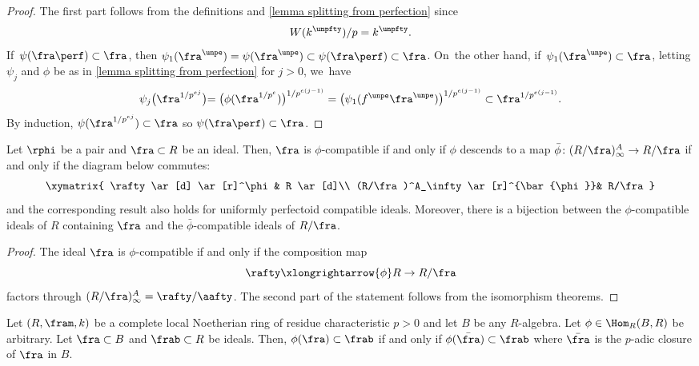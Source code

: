 \begin{proof}
The first part follows from the definitions and \autoref{lemma splitting from perfection} since
\[
W(k^\unpfty)/p=k^\unpfty.
\]
If~$\psi(\fra\perf)\subset\fra$, then $\psi_1(\fra^\unpe)=\psi(\fra^\unpe)\subset\psi(\fra\perf) \subset \fra$. On~the other hand, if~$\psi_1(\fra^\unpe)\subset \fra$,
letting $\psi_j$ and $\phi$ be as in \autoref{lemma splitting from perfection} for $j>0$, we~have
\[
\psi_j\bigl(\fra^{1/p^{ej}}\bigl)=\bigl(\phi(\fra^{1/p^{e}})\bigr)^{1/p^{e(j-1)}}=\bigl(\psi_1(f^\unpe\fra^\unpe) \bigr)^{1/p^{e(j-1)}}\subset \fra^{1/p^{e(j-1)}}.
\]
By induction, $\psi(\fra^{1/p^{ej}})\subset \fra$ so $\psi(\fra\perf)\subset \fra$.
\end{proof}

\begin{proposition}\label{compatible equivalent to comm diag quotient}
Let $\rphi$ be a pair and $\fra\subset R$ be an ideal. Then, $\fra$ is $\phi$\nobreakdash-compatible if and only if $\phi$ descends to a map $\bar{\phi}\colon(R/\fra)^A_\infty\to R/\fra$ \ie if and only if the diagram below commutes:\vspace*{-5pt}
\begin{equation}\label{comm diag quotient comp ideal}
\begin{array}{c}
\xymatrix{
\rafty \ar[d] \ar[r]^\phi & R \ar[d]\\
(R/\fra)^A_\infty\ar[r]^{\bar{\phi}}& R/\fra
}
\end{array}
\end{equation}
and the corresponding result also holds for uniformly perfectoid compatible ideals.
Moreover, there is a bijection between the $\phi$-compatible ideals of $R$ containing $\fra$ and the $\bar{\phi}$-compatible ideals of $R/\fra$.
\end{proposition}

\begin{proof}
The ideal $\fra$ is $\phi$-compatible if and only if the composition map
\[\rafty\xlongrightarrow{\phi} R\to R/\fra
\]factors through $(R/\fra)_\infty^A=\rafty/\aafty$. The second part of the statement follows from the isomorphism theorems.
\end{proof}

\begin{lemma}\label{p adic closure of comp ideal}
Let $(R,\fram, k)$ be a complete local Noetherian ring of residue characteristic $p>0$ and let $B$ be any $R$\nobreakdash-algebra. Let $\phi\in \Hom_R(B,R)$ be arbitrary. Let $\fra\subset B$ and $\frab\subset R$ be ideals. Then, $\phi(\fra)\subset \frab$ if and only if $\phi(\bar{\fra})\subset \frab$ where $\bar{\fra}$ is the $p$-adic closure of $\fra$ in $B$.
\end{lemma}

